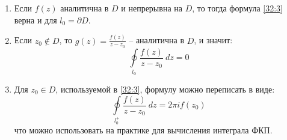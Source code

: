 \documentclass[../../main.tex]{subfiles}
\begin{document}
\begin{remarks}
	\;
	
	\begin{enumerate}
		\item Если $f(z)$ аналитична в $D$ и непрерывна на $D$, то тогда формула 
		\eqref{32:3} верна и для $l_0 = \partial D$.
		\item Если $z_0 \notin D$, то $g(z) = \frac{f(z)}{z-z_0}$ \--- аналитична в 
		$D$, и значит:
		\[  \oint \limits_{l_0} \frac{f(z)}{z-z_0} \ dz = 0  \]
		\item Для $z_0 \in D$, используемой в \eqref{32:3}, формулу можно переписать 
		в виде:
		\begin{equation}
		\label{32:5}
		\oint \limits_{l_0^+} \frac{f(z)}{z-z_0} \ dz = 2 \pi i f(z_0)
		\end{equation}
		что можно использовать на практике для вычисления интеграла ФКП.
	\end{enumerate}
\end{remarks}	
\end{document}
